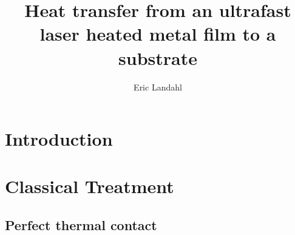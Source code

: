 \documentclass[letterpaper,11pt]{article}
\begin{document}
\title{Heat transfer from an ultrafast laser heated metal film to a substrate}
\author{Eric Landahl}

\maketitle

\section{Introduction}


\section{Classical Treatment}

\subsection{Perfect thermal contact}
\end{document}
